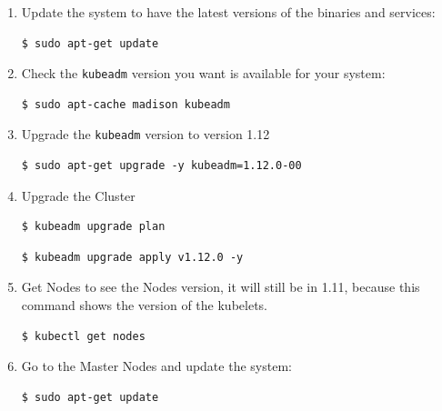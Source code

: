 \documentclass{article}
\newenvironment{codetemplate}[1][]{%
  \mybasecolorbox[#1]
  \itshape
}{%
  \endmybasecolorbox
}
\begin{document}
\begin{enumerate}

    \item Update the system to have the latest versions of the binaries and services:
\begin{codetemplate}{}
\begin{verbatim}
$ sudo apt-get update
\end{verbatim}
\end{codetemplate}

    \item Check the \verb|kubeadm| version you want is available for your system:
\begin{codetemplate}{}
\begin{verbatim}
$ sudo apt-cache madison kubeadm
\end{verbatim}
\end{codetemplate}

    \item Upgrade the \verb|kubeadm| version to version 1.12
\begin{codetemplate}{}
\begin{verbatim}
$ sudo apt-get upgrade -y kubeadm=1.12.0-00
\end{verbatim}
\end{codetemplate}

    \item Upgrade the Cluster
\begin{codetemplate}{}
\begin{verbatim}
$ kubeadm upgrade plan
\end{verbatim}
\end{codetemplate}
\begin{codetemplate}{}
\begin{verbatim}
$ kubeadm upgrade apply v1.12.0 -y
\end{verbatim}
\end{codetemplate}

    \item Get Nodes to see the Nodes version, it will still be in 1.11, because this command shows the version of the kubelets.
\begin{codetemplate}{}
\begin{verbatim}
$ kubectl get nodes
\end{verbatim}
\end{codetemplate}

    \item Go to the Master Nodes and update the system:
\begin{codetemplate}{}
\begin{verbatim}
$ sudo apt-get update
\end{verbatim}
\end{codetemplate}


\end{enumerate}
\end{document}
